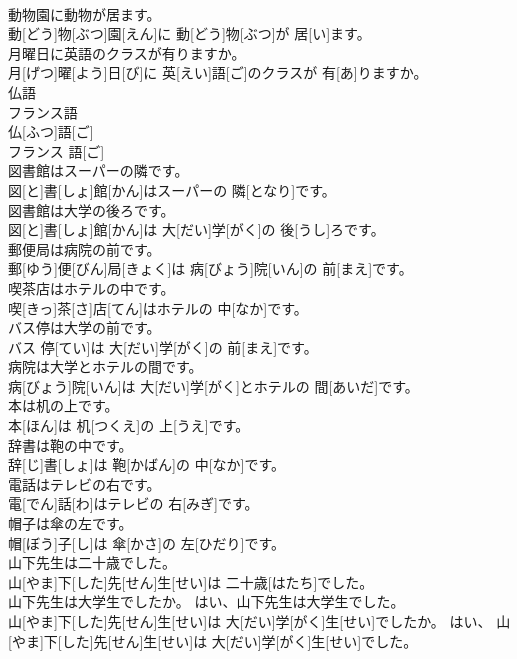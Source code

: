 \documentclass[8pt]{extreport}
\begin{document}
\begin{CJK}{UTF8}{min}
\\	動物園に動物が居ます。	
\\	動[どう]物[ぶつ]園[えん]に 動[どう]物[ぶつ]が 居[い]ます。
\\	月曜日に英語のクラスが有りますか。	
\\	月[げつ]曜[よう]日[び]に 英[えい]語[ご]のクラスが 有[あ]りますか。
\\	仏語 
\\	フランス語	
\\	仏[ふつ]語[ご] 
\\	フランス 語[ご]
\\	図書館はスーパーの隣です。	
\\	図[と]書[しょ]館[かん]はスーパーの 隣[となり]です。
\\	図書館は大学の後ろです。	
\\	図[と]書[しょ]館[かん]は 大[だい]学[がく]の 後[うし]ろです。
\\	郵便局は病院の前です。	
\\	郵[ゆう]便[びん]局[きょく]は 病[びょう]院[いん]の 前[まえ]です。
\\	喫茶店はホテルの中です。	
\\	喫[きっ]茶[さ]店[てん]はホテルの 中[なか]です。
\\	バス停は大学の前です。	
\\	バス 停[てい]は 大[だい]学[がく]の 前[まえ]です。
\\	病院は大学とホテルの間です。	
\\	病[びょう]院[いん]は 大[だい]学[がく]とホテルの 間[あいだ]です。
\\	本は机の上です。	
\\	本[ほん]は 机[つくえ]の 上[うえ]です。
\\	辞書は鞄の中です。	
\\	辞[じ]書[しょ]は 鞄[かばん]の 中[なか]です。
\\	電話はテレビの右です。	
\\	電[でん]話[わ]はテレビの 右[みぎ]です。
\\	帽子は傘の左です。	
\\	帽[ぼう]子[し]は 傘[かさ]の 左[ひだり]です。
\\	山下先生は二十歳でした。	
\\	山[やま]下[した]先[せん]生[せい]は 二十歳[はたち]でした。
\\	山下先生は大学生でしたか。 はい、山下先生は大学生でした。	
\\	山[やま]下[した]先[せん]生[せい]は 大[だい]学[がく]生[せい]でしたか。 はい、 山[やま]下[した]先[せん]生[せい]は 大[だい]学[がく]生[せい]でした。

\end{CJK}
\end{document}
